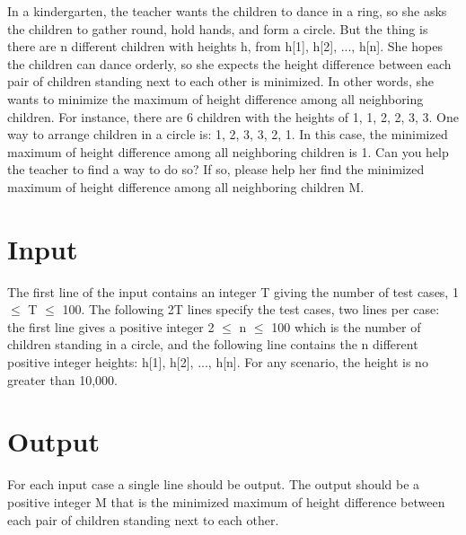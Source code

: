 In a kindergarten, the teacher wants the children to dance in a ring, so she asks the children to gather round, hold hands, and form a circle. But the thing is there are n different children with heights h, from h[1], h[2], ..., h[n]. She hopes the children can dance orderly, so she expects the height difference between each pair of children standing next to each other is minimized. In other words, she wants to minimize the maximum of height difference among all neighboring children. For instance, there are 6 children with the heights of 1, 1, 2, 2, 3, 3. One way to arrange children in a circle is: 1, 2, 3, 3, 2, 1. In this case, the minimized maximum of height difference among all neighboring children is 1. Can you help the teacher to find a way to do so? If so, please help her find the minimized maximum of height difference among all neighboring children M.

\section*{Input}
The first line of the input contains an integer T giving the number of test cases, 1 $\leq$ T $\leq$ 100. The following 2T lines specify the test cases, two lines per case: the first line gives a positive integer 2 $\leq$ n $\leq$ 100 which is the number of children standing in a circle, and the following line contains the n different positive integer heights: h[1], h[2], ..., h[n]. For any scenario, the height is no greater than 10,000.

\section*{Output}
For each input case a single line should be output. The output should be a positive integer M that is the minimized maximum of height difference between each pair of children standing next to each other.